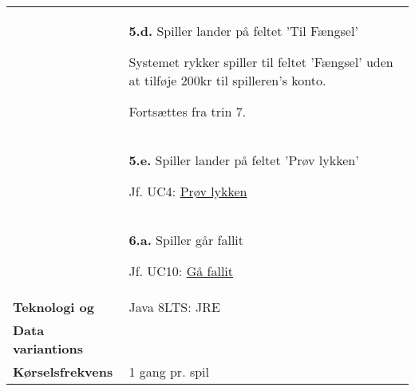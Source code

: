 \documentclass[class=article, crop=false]{standalone}
\begin{document}
\begin{table}[H]
\begin{tabularx}{\textwidth}{|l|X|}
                            & \textbf{5.d.} Spiller lander på feltet 'Til Fængsel'
                            \begin{enumerate} \begin{tabenum}
                                                  \item Systemet rykker spiller til feltet 'Fængsel' uden at tilføje 200kr til spilleren's konto.
                                                  \item Fortsættes fra trin 7.
                            \end{tabenum} \end{enumerate}
                            \\


                            & \textbf{5.e.} Spiller lander på feltet 'Prøv lykken'
                            \begin{enumerate} \begin{tabenum}
                                                  \item Jf. UC4: \underline{Prøv lykken}
                            \end{tabenum} \end{enumerate}
                            \\

                            & \textbf{6.a.} Spiller går fallit
                            \begin{enumerate} \begin{tabenum}
                                                  \item Jf. UC10: \underline{Gå fallit}
                            \end{tabenum} \end{enumerate}
                            \\


            \hline








            \textbf{Teknologi og}     & Java 8LTS: JRE \\
            \textbf{Data variantions} &  \\ \hline
            \textbf{Kørselsfrekvens} & 1 gang pr. spil\\ \hline
        \end{tabularx}


    \end{table}
\end{document}
